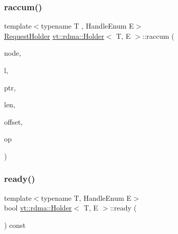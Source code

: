 \subsubsection{\texorpdfstring{raccum()}{raccum()}}
{\footnotesize\ttfamily template$<$typename T , Handle\+Enum E$>$ \\
\hyperlink{structvt_1_1rdma_1_1_request_holder}{Request\+Holder} \hyperlink{structvt_1_1rdma_1_1_holder}{vt\+::rdma\+::\+Holder}$<$ T, E $>$\+::raccum (\begin{DoxyParamCaption}\item[{\hyperlink{namespacevt_a866da9d0efc19c0a1ce79e9e492f47e2}{vt\+::\+Node\+Type}}]{node,  }\item[{\hyperlink{namespacevt_1_1rdma_ac5c20b41a653e520b6305d4d454ecb70}{Lock}}]{l,  }\item[{T $\ast$}]{ptr,  }\item[{std\+::size\+\_\+t}]{len,  }\item[{int}]{offset,  }\item[{M\+P\+I\+\_\+\+Op}]{op }\end{DoxyParamCaption})}

\mbox{\label{structvt_1_1rdma_1_1_holder_a61b649c8c420b9f2f6310d752bdef79c}} 
\subsubsection{\texorpdfstring{ready()}{ready()}}
{\footnotesize\ttfamily template$<$typename T, Handle\+Enum E$>$ \\
bool \hyperlink{structvt_1_1rdma_1_1_holder}{vt\+::rdma\+::\+Holder}$<$ T, E $>$\+::ready (\begin{DoxyParamCaption}{ }\end{DoxyParamCaption}) const\hspace{0.3cm}{\ttfamily [inline]}}

\mbox{\label{structvt_1_1rdma_1_1_holder_abca462aa3e98d1c0fb4852743eaed04a}} 
